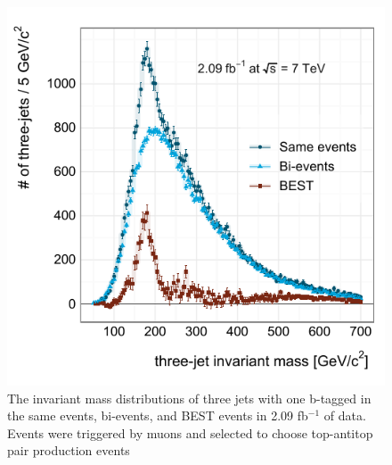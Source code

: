 \begin{figure}[!h]
 \begin{center}
  \includegraphics[scale=1.]{figs/best/c110506_s0102_g002_01}
  \caption{The invariant mass distributions of three jets with one
  b-tagged in the same events, bi-events, and BEST events in 2.09
  fb${}^{-1}$ of data. Events were triggered by muons and selected to
  choose top-antitop pair production events} \label{151919_8Aug11}
 \end{center}
\end{figure}

